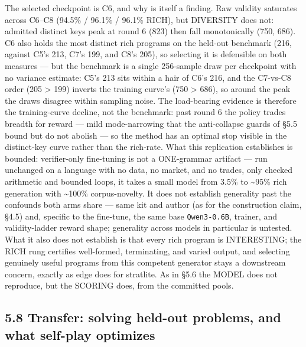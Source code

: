 \documentclass[11pt]{article}
\newcommand{\code}[1]{\texttt{#1}}
\begin{document}
The selected checkpoint is C6, and why is itself a finding. Raw validity
saturates across C6--C8 (94.5\% / 96.1\% / 96.1\% RICH), but DIVERSITY does not:
admitted distinct keys peak at round 6 (823) then fall monotonically (750, 686).
C6 also holds the most distinct rich programs on the held-out benchmark (216,
against C5's 213, C7's 199, and C8's 205), so selecting it is defensible on both
measures --- but the benchmark is a single 256-sample draw per checkpoint with no
variance estimate: C5's 213 sits within a hair of C6's 216, and the C7-vs-C8
order (205 > 199) inverts the training curve's (750 > 686), so around the peak
the draws disagree within sampling noise. The
load-bearing evidence is therefore the training-curve decline, not the
benchmark: past round 6 the policy trades breadth for reward --- mild
mode-narrowing that the anti-collapse guards of \S{}5.5 bound but do not abolish ---
so the method has an optimal stop visible in the distinct-key curve rather than
the rich-rate. What this replication establishes is bounded: verifier-only
fine-tuning is not a ONE-grammar artifact --- run unchanged on a language with no
data, no market, and no trades, only checked arithmetic and bounded loops, it
takes a small model from 3.5\% to \textasciitilde{}95\% rich generation with \textasciitilde{}100\% corpus-novelty.
It does not establish generality past the confounds both arms share --- same kit
and author (as for the construction claim, \S{}4.5) and, specific to the fine-tune,
the same base \code{Qwen3-0.6B}, trainer, and validity-ladder reward shape; generality
across models in particular is untested. What it also
does not establish is that every rich program is INTERESTING; the RICH rung
certifies well-formed, terminating,
and varied output, and selecting genuinely useful programs from this competent
generator stays a downstream concern, exactly as edge does for stratlite. As in
\S{}5.6 the MODEL does not reproduce, but the SCORING does, from the committed
pools.

\subsection*{5.8 Transfer: solving held-out problems, and what self-play optimizes}
\end{document}

